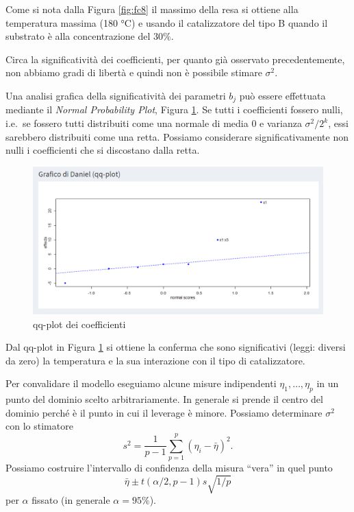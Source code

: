 \documentclass[
  11pt,
]{book}
\begin{document}
Come si nota dalla Figura \ref{fig:fc8} il massimo della resa si ottiene
alla temperatura massima (180 °C) e usando il catalizzatore del tipo B
quando il substrato è alla concentrazione del 30\%.

Circa la significatività dei coefficienti, per quanto già osservato
precedentemente, non abbiamo gradi di libertà e quindi non è possibile
stimare \(\sigma^2\).

Una analisi grafica della significatività dei parametri \(b_j\) può essere
effettuata mediante il \emph{Normal Probability Plot}, Figura \ref{fig:fc9}. Se
tutti i coefficienti fossero nulli, i.e.~se fossero tutti distribuiti
come una normale di media \(0\) e varianza \(\sigma^2/2^k\), essi sarebbero
distribuiti come una retta. Possiamo considerare significativamente non
nulli i coefficienti che si discostano dalla retta.

\begin{figure}

{\centering \includegraphics[width=1\linewidth]{Immagini/Fatt_compl/09_qqplot} 

}

\caption{qq-plot dei coefficienti}\label{fig:fc9}
\end{figure}

Dal qq-plot in Figura \ref{fig:fc9} si ottiene la conferma che sono
significativi (leggi: diversi da zero) la temperatura e la sua
interazione con il tipo di catalizzatore.

Per convalidare il modello eseguiamo alcune misure indipendenti
\(\eta_1,\dots,\eta_p\) in un punto del dominio scelto arbitrariamente. In
generale si prende il centro del dominio perché è il punto in cui il
leverage è minore. Possiamo determinare \(\sigma^2\) con lo stimatore \[
s^2=\frac{1}{p-1}\sum_{p=1}^p(\eta_i-\bar{\eta})^2.
\] Possiamo costruire l'intervallo di confidenza della misura ``vera'' in
quel punto \[
\bar{\eta}\pm t(\alpha/2,p-1)s\sqrt{1/p}
\] per \(\alpha\) fissato (in generale \(\alpha=95\%\)).
\end{document}
